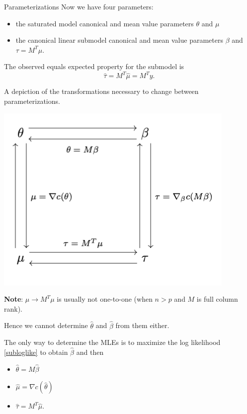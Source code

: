\documentclass[
  ignorenonframetext,
]{beamer}
\providecommand{\tightlist}{%
  \setlength{\itemsep}{0pt}\setlength{\parskip}{0pt}}
\begin{document}
\begin{frame}{Parameterizations}
\protect\hypertarget{parameterizations}{}
Now we have four parameters:

\begin{itemize}
\tightlist
\item
  the saturated model canonical and mean value parameters \(\theta\) and
  \(\mu\)
\item
  the canonical linear submodel canonical and mean value parameters
  \(\beta\) and \(\tau = M^T\mu\).
\end{itemize}

The observed equals expected property for the submodel is
\begin{equation} \label{submodelmvp}
    \hat\tau = M^T\hat\mu = M^Ty.
\end{equation}
\end{frame}

\begin{frame}{}
\protect\hypertarget{section-3}{}
A depiction of the transformations necessary to change between
parameterizations.

\includegraphics{transformations.png}
\end{frame}

\begin{frame}{}
\protect\hypertarget{section-4}{}
\textbf{Note}: \(\mu \to M^T\mu\) is usually not one-to-one (when
\(n > p\) and \(M\) is full column rank).

Hence we cannot determine \(\hat\theta\) and \(\hat\beta\) from them
either.

The only way to determine the MLEs is to maximize the log likelihood
\eqref{subloglike} to obtain \(\hat\beta\) and then

\begin{itemize}
\tightlist
\item
  \(\hat\theta = M\hat\beta\)
\item
  \(\hat\mu = \nabla c(\hat\theta)\)
\item
  \(\hat\tau = M^T\hat\mu\).
\end{itemize}
\end{frame}
\end{document}

